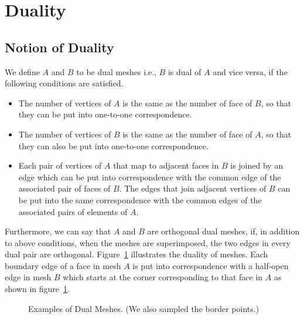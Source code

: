 \documentclass{InsightArticle}
\begin{document}
\section{Duality}
\subsection{Notion of Duality}
We define $A$ and $B$ to be dual meshes i.e., $B$ is dual of $A$ and vice versa, if the following conditions are satisfied.
\begin{itemize}
	\item The number of vertices of $A$ is the same as the number of face of $B$, so that they can be put into one-to-one correspondence.
	\item The number of vertices of $B$ is the same as the number of face of $A$, so that they can also be put into one-to-one correspondence.
	\item Each pair of vertices of $A$ that map to adjacent faces in $B$ is joined by an edge which can be put into correspondence with the common edge of the associated pair of faces of $B$. The edges that join adjacent vertices of $B$ can be put into the same correspondence with the common edges of the associated pairs of elements of $A$. 
\end{itemize}

Furthermore, we can say that $A$ and $B$ are orthogonal dual meshes, if, in addition to above conditions, when the meshes are superimposed, the two edges in every dual pair are orthogonal. Figure~\ref{fig:dualMeshes} illustrates the duality of meshes. Each boundary edge of a face in mesh $A$ is put into correspondence with a half-open edge in mesh $B$ which starts at the corner corresponding to that face in $A$ as shown in figure~\ref{fig:dualMeshes}.
\begin{figure}[!t]
	\centering
	\caption{Examples of Dual Meshes. (We also sampled the border points.)}
	\label{fig:dualMeshes}
\end{figure}
\end{document}
